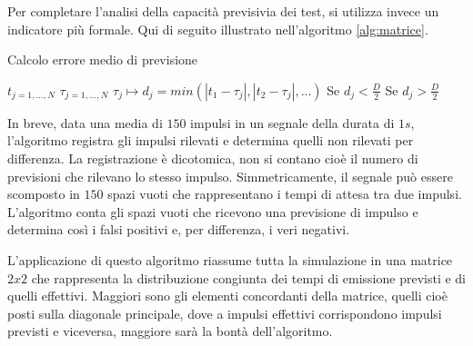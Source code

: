 Per completare l'analisi della capacità previsivia dei test, si utilizza invece un indicatore più formale. Qui di seguito illustrato nell'algoritmo \ref{alg:matrice}.

\begin{algorithm}
\caption{Calcolo errore medio di previsione}\label{alg:matrice}
\begin{algorithmic}[1]

\State $t_{j=1,...,N}$ 
\State $\tau_{j=1,...,N}$ 
\State $\tau_{j}\mapsto d_{j} = min( |t_{1}-\tau_{j}|, |t_{2}-\tau_{j}|, ...)$ 
\State Se $d_{j}<\frac{D}{2}$ 
\State Se $d_{j}>\frac{D}{2}$ 
\State  {}
\State  {}

\end{algorithmic}
\end{algorithm}

In breve, data una media di $150$ impulsi in un segnale della durata di $1s$, l'algoritmo registra gli impulsi rilevati e determina quelli non rilevati per differenza. La registrazione è dicotomica, non si contano cioè il numero di previsioni che rilevano lo stesso impulso. Simmetricamente, il segnale può essere scomposto in $150$ spazi vuoti che rappresentano i tempi di attesa tra due impulsi. L'algoritmo conta gli spazi vuoti che ricevono una previsione di impulso e determina così i falsi positivi e, per differenza, i veri negativi.

L'applicazione di questo algoritmo riassume tutta la simulazione in una matrice $2x2$ che rappresenta la distribuzione congiunta dei tempi di emissione previsti e di quelli effettivi. Maggiori sono gli elementi concordanti della matrice, quelli cioè posti sulla diagonale principale, dove a impulsi effettivi corrispondono impulsi previsti e viceversa, maggiore sarà la bontà dell'algoritmo.

